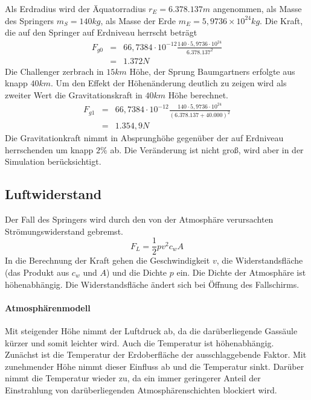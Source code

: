 Als Erdradius wird der Äquatorradius $r_E=6.378.137m$ angenommen, als Masse des Springers $m_S=140kg$, als Masse der Erde $m_E=5,9736\times 10^{24}kg$.
Die Kraft, die auf den Springer auf Erdniveau herrscht beträgt
\begin{eqnarray}
F_{g0} &=& 66,7384\cdot 10^{-12} \frac{140\cdot 5,9736\cdot 10^{24}}{6.378.137^2} \\
 &=& 1.372 N \nonumber
\end{eqnarray}
Die Challenger zerbrach in $15km$ Höhe, der Sprung Baumgartners erfolgte aus knapp $40km$.
Um den Effekt der Höhenänderung deutlich zu zeigen wird als zweiter Wert die Gravitationskraft in $40km$ Höhe berechnet.
\begin{eqnarray}
F_{g1} &=& 66,7384\cdot 10^{-12} \frac{140\cdot 5,9736\cdot 10^{24}}{\left(6.378.137 + 40.000\right)^2} \\
 &=& 1.354,9 N \nonumber
\end{eqnarray}
Die Gravitationkraft nimmt in Absprunghöhe gegenüber der auf Erdniveau herrschenden um knapp $2\%$ ab.
Die Veränderung ist nicht groß, wird aber in der Simulation berücksichtigt.

\subsection{Luftwiderstand}
Der Fall des Springers wird durch den von der Atmosphäre verursachten Strömungswiderstand gebremst.
\begin{equation}
F_L=\frac{1}{2}pv^2c_wA
\end{equation}
In die Berechnung der Kraft gehen die Geschwindigkeit $v$, die Widerstandsfläche (das Produkt aus $c_w$ und $A$) und die Dichte $p$ ein.
Die Dichte der Atmosphäre ist höhenabhängig.
Die Widerstandsfläche ändert sich bei Öffnung des Fallschirms.



\paragraph{Atmosphärenmodell}
Mit steigender Höhe nimmt der Luftdruck ab, da die darüberliegende Gassäule kürzer und somit leichter wird.
Auch die Temperatur ist höhenabhängig.
Zunächst ist die Temperatur der Erdoberfläche der ausschlaggebende Faktor.
Mit zunehmender Höhe nimmt dieser Einfluss ab und die Temperatur sinkt.
Darüber nimmt die Temperatur wieder zu, da ein immer geringerer Anteil der Einstrahlung von darüberliegenden Atmosphärenschichten blockiert wird.

